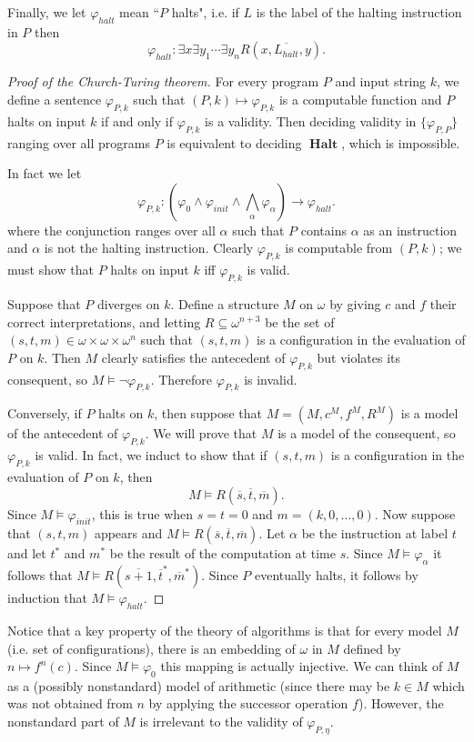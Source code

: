 \documentclass[12pt]{report}
\DeclareMathOperator{\Halt}{\mathbf{Halt}}
\theoremstyle{definition}
\begin{document}
Finally, we let $\varphi_{halt}$ mean ``$P$ halts", i.e. if $L$ is the label of the halting instruction in $P$ then
$$\varphi_{halt}: \exists x \exists y_1 \cdots \exists y_n R(x, \overline{L_{halt}}, y).$$
\begin{proof}[Proof of the Church-Turing theorem]
For every program $P$ and input string $k$, we define a sentence $\varphi_{P,k}$ such that $(P, k) \mapsto \varphi_{P,k}$ is a computable function and $P$ halts on input $k$ if and only if $\varphi_{P,k}$ is a validity. Then deciding validity in $\{\varphi_{P,P}\}$ ranging over all programs $P$ is equivalent to deciding $\Halt$, which is impossible.

In fact we let
$$\varphi_{P,k}: \left(\varphi_0 \wedge \varphi_{init} \wedge \bigwedge_\alpha \varphi_\alpha\right) \to \varphi_{halt}.$$
where the conjunction ranges over all $\alpha$ such that $P$ contains $\alpha$ as an instruction and $\alpha$ is not the halting instruction. Clearly $\varphi_{P,k}$ is computable from $(P,k)$; we must show that $P$ halts on input $k$ iff $\varphi_{P,k}$ is valid.

Suppose that $P$ diverges on $k$. Define a structure $M$ on $\omega$ by giving $c$ and $f$ their correct interpretations, and letting $R \subseteq \omega^{n+3}$ be the set of $(s, t, m) \in \omega \times \omega \times \omega^n$ such that $(s, t, m)$ is a configuration in the evaluation of $P$ on $k$.
Then $M$ clearly satisfies the antecedent of $\varphi_{P,k}$ but violates its consequent, so $M \models \neg \varphi_{P,k}$. Therefore $\varphi_{P,k}$ is invalid.

Conversely, if $P$ halts on $k$, then suppose that $M = (M, c^M, f^M, R^M)$ is a model of the antecedent of $\varphi_{P,k}$. We will prove that $M$ is a model of the consequent, so $\varphi_{P,k}$ is valid. In fact, we induct to show that if $(s, t, m)$ is a configuration in the evaluation of $P$ on $k$, then
$$M \models R(\overline s, \overline t, \overline m).$$
Since $M \models \varphi_{init}$, this is true when $s = t = 0$ and $m = (k, 0, \dots, 0)$. Now suppose that $(s, t, m)$ appears and $M \models R(\overline s, \overline t, \overline m)$. Let $\alpha$ be the instruction at label $t$ and let $t^*$ and $m^*$ be the result of the computation at time $s$.
Since $M \models \varphi_\alpha$ it follows that $M \models R(\overline{s+1}, \overline t^*, \overline m^*)$.
Since $P$ eventually halts, it follows by induction that $M \models \varphi_{halt}$.
\end{proof}
Notice that a key property of the theory of algorithms is that for every model $M$ (i.e. set of configurations), there is an embedding of $\omega$ in $M$ defined by $n \mapsto f^n(c)$. Since $M \models \varphi_0$ this mapping is actually injective. We can think of $M$ as a (possibly nonstandard) model of arithmetic (since there may be $k \in M$ which was not obtained from $n$ by applying the successor operation $f$). However, the nonstandard part of $M$ is irrelevant to the validity of $\varphi_{P,\eta}$.
\end{document}
